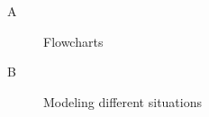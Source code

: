 
\chapter*{\appendixlistname}

\begin{description}
    \item[\appendixname{} A] Flowcharts
    \item[\appendixname{} B] Modeling different situations
\end{description}
